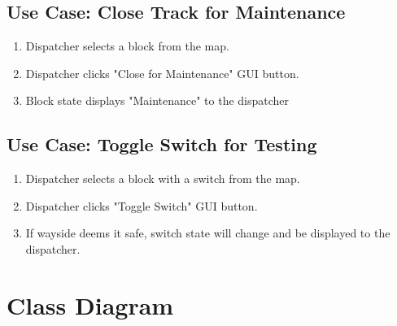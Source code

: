 \documentclass{scrreprt}
\begin{document}
\subsection{Use Case: Close Track for Maintenance}
\begin{enumerate}
	\item Dispatcher selects a block from the map.
	\item Dispatcher clicks "Close for Maintenance" GUI button.
	\item Block state displays "Maintenance" to the dispatcher
\end{enumerate}

\subsection{Use Case: Toggle Switch for Testing}
\begin{enumerate}
	\item Dispatcher selects a block with a switch from the map.
	\item Dispatcher clicks "Toggle Switch" GUI button.
	\item If wayside deems it safe, switch state will change and be displayed to the dispatcher.
\end{enumerate}


\section{Class Diagram}
\end{document}
